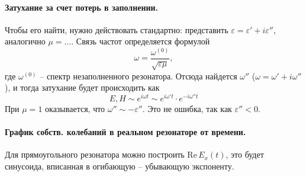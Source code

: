 \documentclass[a4paper,14pt]{extarticle}
\begin{document}
\paragraph{Затухание за счет потерь в заполнении.} Чтобы его найти, нужно действовать стандартно: представить 
$\varepsilon=\varepsilon'+i \varepsilon''$, аналогично $\mu=\ldots$. Связь частот определяется формулой
\begin{equation}
	\omega=\frac{\omega^{(0)}}{\sqrt{\varepsilon \mu}},
\end{equation}
где $\omega^{(0)}$ -- спектр незаполненного резонатора. Отсюда найдется $\omega''$ ($\omega=\omega'+i \omega''$), и тогда затухание будет происходить как 
\begin{equation}
	E,H  \sim e^{i \omega t} \sim e^{i \omega' t}\cdot e^{-i \omega'' t}
\end{equation}
При $\mu=1$ оказывается, что $\omega''\sim -\varepsilon''$. Это не ошибка, так как $\varepsilon''<0$. %
\paragraph{График собств. колебаний в реальном резонаторе от времени.} Для прямоугольного резонатора можно построить $\mathrm{Re}\, E_x(t)$, это будет синусоида, вписанная в огибающую -- убывающую экспоненту. 
\end{document}
